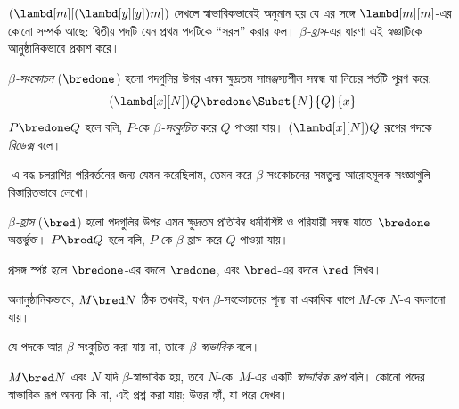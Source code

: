 \documentclass[../../../include/open-logic-section]{subfiles}
\begin{document}

$(\lambd[m][(\lambd[y][y]) m])$ দেখলে স্বাভাবিকভাবেই অনুমান হয় যে
এর সঙ্গে $\lambd[m][m]$-এর কোনো সম্পর্ক আছে: দ্বিতীয় পদটি যেন প্রথম
পদটিকে “সরল” করার ফল। \emph{$\beta$-হ্রাস}-এর ধারণা এই স্বজ্ঞাটিকে
আনুষ্ঠানিকভাবে প্রকাশ করে।

\begin{defn} 
  \emph{$\beta$-সংকোচন} ($\bredone$) হলো পদগুলির উপর এমন ক্ষুদ্রতম
  সামঞ্জস্যশীল সম্বন্ধ যা নিচের শর্তটি পূরণ করে:
  \[
    (\lambd[x][N])Q \bredone \Subst{N}{Q}{x} 
  \]
  $P \bredone Q$ হলে বলি, $P$-কে \emph{$\beta$-সংকুচিত} করে $Q$
  পাওয়া যায়। $(\lambd[x][N])Q$ রূপের পদকে \emph{রিডেক্স} বলে।
\end{defn}

\begin{prob} 
  -এ বদ্ধ চলরাশির পরিবর্তনের জন্য
  যেমন করেছিলাম, তেমন করে $\beta$-সংকোচনের সমতুল্য আরোহমূলক সংজ্ঞাগুলি
  বিস্তারিতভাবে লেখো।
\end{prob}
  
\begin{defn} 
  \emph{$\beta$-হ্রাস} ($\bred$) হলো পদগুলির উপর এমন ক্ষুদ্রতম
  প্রতিবিম্ব ধর্মবিশিষ্ট ও পরিযায়ী সম্বন্ধ যাতে~$\bredone$ অন্তর্ভুক্ত।
  $P \bred Q$ হলে বলি, $P$-কে $\beta$-হ্রাস করে $Q$ পাওয়া যায়।
\end{defn}

প্রসঙ্গ স্পষ্ট হলে $\bredone$-এর বদলে $\redone$, এবং $\bred$-এর বদলে
$\red$ লিখব।

অনানুষ্ঠানিকভাবে, $M \bred N$ ঠিক তখনই, যখন $\beta$-সংকোচনের শূন্য
বা একাধিক ধাপে $M$-কে $N$-এ বদলানো যায়।

\begin{defn}[$\beta$-স্বাভাবিক]
যে পদকে আর $\beta$-সংকুচিত করা যায় না, তাকে \emph{$\beta$-স্বাভাবিক}
বলে।
\end{defn}

$M \bred N$ এবং $N$ যদি $\beta$-স্বাভাবিক হয়, তবে $N$-কে~$M$-এর
একটি \emph{স্বাভাবিক রূপ} বলি। কোনো পদের স্বাভাবিক রূপ অনন্য কি না,
এই প্রশ্ন করা যায়; উত্তর হ্যাঁ, যা পরে দেখব।
\end{document}
